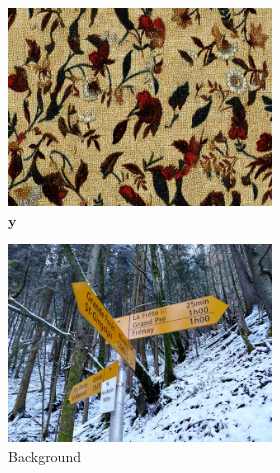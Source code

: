 \begin{figure}[]
    \begin{subfigure}{\textwidth}
        \centering
        \begin{subfigure}{0.24\textwidth}
            \centering
            \includegraphics[width=\textwidth]{images/04-experiment02/photo/flowers2/target.jpg}
            \caption*{\(\bm{y}\)}
        \end{subfigure}
        \hfill
        \begin{subfigure}{0.24\textwidth}
            \centering
            \includegraphics[width=\textwidth]{images/04-experiment02/photo/bg.jpg}
            \caption*{Background}
        \end{subfigure}
        \hfill
        \begin{subfigure}{0.24\textwidth}

\end{subfigure}
\end{subfigure}
\end{figure}
